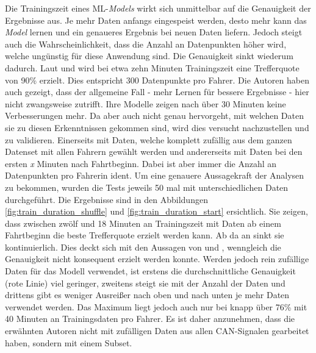 Die Trainingszeit eines ML-\textit{Models} wirkt sich unmittelbar auf die Genauigkeit der Ergebnisse aus. Je mehr Daten anfangs eingespeist werden, desto mehr kann das \textit{Model} lernen und ein genaueres Ergebnis bei neuen Daten liefern. Jedoch steigt auch die Wahrscheinlichkeit, dass die Anzahl an Datenpunkten höher wird, welche ungünstig für diese Anwendung sind. Die Genauigkeit sinkt wiederum dadurch. Laut \cite{Enev2016} und \cite{Ezzini2018} wird bei etwa zehn Minuten Trainingszeit eine Trefferquote von 90\% erzielt. Dies entspricht 300 Datenpunkte pro Fahrer. Die Autoren haben auch gezeigt, dass der allgemeine Fall - mehr Lernen für bessere Ergebnisse - hier nicht zwangsweise zutrifft. Ihre Modelle zeigen nach über 30 Minuten keine Verbesserungen mehr. Da aber auch nicht genau hervorgeht, mit welchen Daten sie zu diesen Erkenntnissen gekommen sind, wird dies versucht nachzustellen und zu validieren. Einerseits mit Daten, welche komplett zufällig aus dem ganzen Datenset mit allen Fahrern gewählt werden und andererseits mit Daten bei den ersten \textit{x} Minuten nach Fahrtbeginn. Dabei ist aber immer die Anzahl an Datenpunkten pro Fahrerin ident. Um eine genauere Aussagekraft der Analysen zu bekommen, wurden die Tests jeweils 50 mal mit unterschiedlichen Daten durchgeführt. Die Ergebnisse sind in den Abbildungen \ref{fig:train_duration_shuffle} und \ref{fig:train_duration_start} ersichtlich. Sie zeigen, dass zwischen zwölf und 18 Minuten an Trainingszeit mit Daten ab einem Fahrtbeginn die beste Trefferquote erzielt werden kann. Ab da an sinkt sie kontinuierlich. Dies deckt sich mit den Aussagen von \cite{Enev2016} und \cite{Ezzini2018}, wenngleich die Genauigkeit nicht konsequent erzielt werden konnte. Werden jedoch rein zufällige Daten für das Modell verwendet, ist erstens die durchschnittliche Genauigkeit (rote Linie) viel geringer, zweitens steigt sie mit der Anzahl der Daten und drittens gibt es weniger Ausreißer nach oben und nach unten je mehr Daten verwendet werden. Das Maximum liegt jedoch auch nur bei knapp über 76\% mit 40 Minuten an Trainingsdaten pro Fahrer. Es ist daher anzunehmen, dass die erwähnten Autoren nicht mit zufälligen Daten aus allen CAN-Signalen gearbeitet haben, sondern mit einem Subset.

